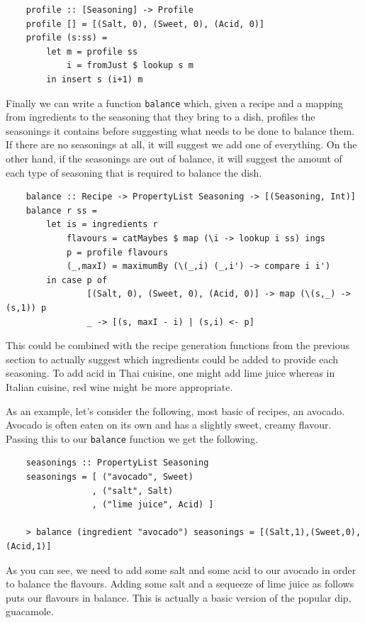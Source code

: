 \documentclass[11pt]{article}
\begin{document}
\begin{lstlisting}
    profile :: [Seasoning] -> Profile
    profile [] = [(Salt, 0), (Sweet, 0), (Acid, 0)]
    profile (s:ss) =
        let m = profile ss
            i = fromJust $ lookup s m
        in insert s (i+1) m
\end{lstlisting}

Finally we can write a function \texttt{balance} which, given a recipe and
a mapping from ingredients to the seasoning that they bring to a dish,
profiles the seasonings it contains before suggesting what needs to be done
to balance them. If there are no seasonings at all, it will suggest we add
one of everything. On the other hand, if the seasonings are out of balance,
it will suggest the amount of each type of seasoning that is required
to balance the dish.

\begin{lstlisting}
    balance :: Recipe -> PropertyList Seasoning -> [(Seasoning, Int)]
    balance r ss =
        let is = ingredients r
            flavours = catMaybes $ map (\i -> lookup i ss) ings
            p = profile flavours
            (_,maxI) = maximumBy (\(_,i) (_,i') -> compare i i')
        in case p of
                [(Salt, 0), (Sweet, 0), (Acid, 0)] -> map (\(s,_) -> (s,1)) p
                _ -> [(s, maxI - i) | (s,i) <- p]
\end{lstlisting}

This could be combined with the recipe generation functions from the previous
section to actually suggest which ingredients could be added to provide
each seasoning. To add acid in Thai cuisine, one might add lime juice whereas
in Italian cuisine, red wine might be more appropriate.

\medbreak

As an example, let's consider the following, most basic of recipes, an avocado.
Avocado is often eaten on its own and has a slightly sweet, creamy flavour.
Passing this to our \texttt{balance} function we get the following.

\begin{lstlisting}
    seasonings :: PropertyList Seasoning
    seasonings = [ ("avocado", Sweet)
                 , ("salt", Salt)
                 , ("lime juice", Acid) ]

    > balance (ingredient "avocado") seasonings = [(Salt,1),(Sweet,0),(Acid,1)]
\end{lstlisting}

As you can see, we need to add some salt and some acid to our avocado in order
to balance the flavours. Adding some salt and a sequeeze of lime juice
as follows puts our flavours in balance. This is actually a basic version
of the popular dip, guacamole.
\end{document}
